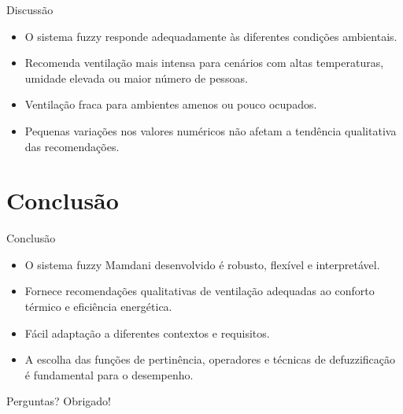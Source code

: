 \documentclass[aspectratio=169]{beamer}
\begin{document}
\begin{frame}{Discussão}
    \begin{itemize}
        \item O sistema fuzzy responde adequadamente às diferentes condições ambientais.
        \item Recomenda ventilação mais intensa para cenários com altas temperaturas, umidade elevada ou maior número de pessoas.
        \item Ventilação fraca para ambientes amenos ou pouco ocupados.
        \item Pequenas variações nos valores numéricos não afetam a tendência qualitativa das recomendações.
    \end{itemize}
\end{frame}

\section{Conclusão}

\begin{frame}{Conclusão}
    \begin{itemize}
        \item O sistema fuzzy Mamdani desenvolvido é robusto, flexível e interpretável.
        \item Fornece recomendações qualitativas de ventilação adequadas ao conforto térmico e eficiência energética.
        \item Fácil adaptação a diferentes contextos e requisitos.
        \item A escolha das funções de pertinência, operadores e técnicas de defuzzificação é fundamental para o desempenho.
    \end{itemize}
\end{frame}

\begin{frame}{Perguntas?}
    \centering
    \Huge Obrigado!
\end{frame}
\end{document}
